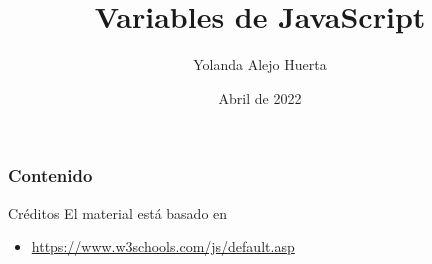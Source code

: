 \documentclass[aspectratio=169]{beamer}
\title{Variables de JavaScript} %
\author{Yolanda Alejo Huerta} %
\institute[CBTIS 246] %
{
 Centro de Bachillerato Tecnológico\\%
 Industrial y de Servicios 246 \\
 El Amo Torres \\
\medskip
\textit{yolanda.alejo@cbtis-246.edu.mx}
}
\date{
   Abril de 2022
} %
\begin{document}
\begin{frame}
    \titlepage
\end{frame}

\begin{frame}
    \frametitle{Contenido}
    \tableofcontents
\end{frame}



\begin{frame}[c]{Créditos}
  El material está basado en
  \begin{itemize}
    \item \href{https://www.w3schools.com/js/default.asp}{https://www.w3schools.com/js/default.asp}
  \end{itemize}
\end{frame}
\end{document}
